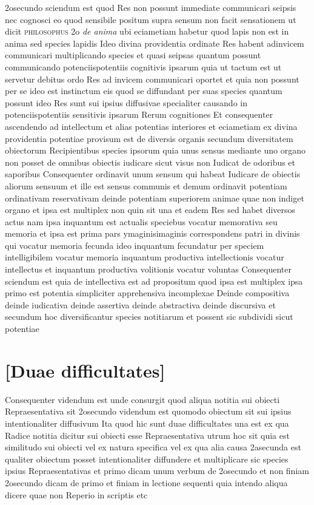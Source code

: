 \documentclass[twoside, openright]{report}
\newcommand{\name}[1]{\textsc{#1}}
\newcommand{\worktitle}[1]{\textit{#1}}
\begin{document}
        \pstart
        2osecundo sciendum est quod Res non possunt immediate communicari seipsis nec cognosci eo quod sensibile positum supra sensum non facit sensationem ut dicit \name{philosophus} 2o \worktitle{de anima} ubi eciametiam habetur quod lapis non est in anima sed species lapidis Ideo divina providentia ordinate Res habent adinvicem communicari multiplicando species et quasi seipsas quantum possunt communicando potenciispotentiis cognitivis ipsarum quia ut tactum est ut servetur debitus ordo Res ad invicem communicari oportet  et quia non possunt per se ideo est instinctum eis quod se diffundant per suas species quantum possunt ideo Res sunt sui ipsius diffusivae specialiter causando in potenciispotentiis sensitivis ipsarum Rerum cognitiones Et consequenter ascendendo ad intellectum et alias potentias interiores et eciametiam ex divina providentia potentiae provisum est de diversis organis secundum diversitatem obiectorum Recipientibus species ipsorum quia unus sensus mediante uno organo non posset de omnibus obiectis iudicare sicut visus non Iudicat de odoribus et saporibus Consequenter ordinavit unum sensum qui habeat Iudicare de obiectis aliorum sensuum et ille est sensus communis et demum ordinavit potentiam ordinativam reservativam deinde potentiam superiorem animae quae non indiget organo et ipsa est multiplex non quin sit una et eadem Res sed habet diversos actus nam ipsa inquantum est actualis speciebus vocatur memorativa seu memoria et ipsa est prima pars ymaginisimaginis correspondens patri in divinis qui vocatur memoria fecunda ideo inquantum fecundatur per speciem intelligibilem vocatur memoria inquantum productiva intellectionis vocatur intellectus et inquantum productiva volitionis vocatur voluntas Consequenter sciendum est quia de intellectiva est ad propositum quod ipsa est multiplex ipsa primo est potentia simpliciter apprehensiva incomplexae Deinde compositiva deinde iudicativa deinde assertiva deinde abstractiva deinde discursiva et secundum hoc diversificantur species notitiarum et possent sic subdividi sicut potentiae
        \pend
      
        \bigskip
         \section*{[Duae difficultates]} 
        \pstart
        Consequenter videndum est unde consurgit quod aliqua notitia sui obiecti Repraesentativa sit 2osecundo videndum est quomodo obiectum sit sui ipsius intentionaliter diffusivum Ita quod hic sunt duae difficultates una est ex qua Radice notitia dicitur sui obiecti esse Repraesentativa utrum hoc sit quia est similitudo sui obiecti vel ex natura specifica vel ex qua alia causa 2asecunda est qualiter obiectum posset intentionaliter diffundere et multiplicare sic species ipsius Repraesentativas et primo dicam unum verbum de 2osecundo et non finiam 2osecundo dicam de primo et finiam in lectione sequenti quia intendo aliqua dicere quae non Reperio in scriptis etc
        \pend
      
\end{document}

